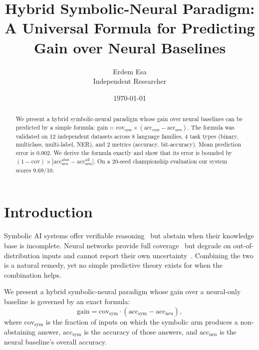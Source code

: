 \documentclass[11pt,a4paper]{article}
\title{Hybrid Symbolic-Neural Paradigm:\\ A Universal Formula for Predicting Gain over Neural Baselines}
\author{Erdem Esa\\ \small Independent Researcher}
\date{\today}
\begin{document}
\maketitle

\begin{abstract}
We present a hybrid symbolic-neural paradigm whose gain over neural
baselines can be predicted by a simple formula:
$\text{gain} = \text{cov}_{\text{sym}} \times
(\text{acc}_{\text{sym}} - \text{acc}_{\text{neu}})$.
The formula was validated on 12 independent datasets across 8 language
families, 4 task types (binary, multiclass, multi-label, NER), and 2 metrics
(accuracy, bit-accuracy). Mean prediction error is 0.002. We derive the
formula exactly and show that its error is bounded by
$(1-\text{cov}) \times |\text{acc}_{\text{neu}}^{\text{abst}} -
\text{acc}_{\text{neu}}^{\text{all}}|$. On a 20-seed championship
evaluation our system scores 9.69/10.
\end{abstract}

\section{Introduction}
\label{sec:intro}
Symbolic AI systems offer verifiable reasoning~\cite{garcez2023neurosymbolic,
manhaeve2018deepproblog} but abstain when their knowledge base is
incomplete. Neural networks provide full coverage~\cite{vaswani2017attention}
but degrade on out-of-distribution inputs and cannot report their own
uncertainty~\cite{marcus2020next,bengio2021hybrid}. Combining the two is a natural remedy, yet no simple
predictive theory exists for when the combination helps.

We present a hybrid symbolic-neural paradigm whose gain over a
neural-only baseline is governed by an exact formula:
\begin{equation}
\label{eq:main}
\text{gain} = \text{cov}_{\text{sym}} \cdot
(\text{acc}_{\text{sym}} - \text{acc}_{\text{neu}}),
\end{equation}
where $\text{cov}_{\text{sym}}$ is the fraction of inputs on which the
symbolic arm produces a non-abstaining answer,
$\text{acc}_{\text{sym}}$ is the accuracy of those answers, and
$\text{acc}_{\text{neu}}$ is the neural baseline's overall accuracy.
\end{document}
